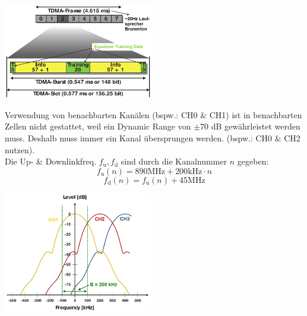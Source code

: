     \begin{minipage}{6.5cm}        
        \includegraphics[width=6.5cm]{./bilder/systems-tdma.png} \\
        
    \end{minipage}
    \begin{minipage}{0.5cm}        
        \quad
    \end{minipage}
    \begin{minipage}{5.4cm} 
         \small
        Verwendung von benachbarten Kanälen (bspw.: CH0 \& CH1) ist in benachbarten Zellen nicht gestattet, weil ein
        Dynamic Range von $\pm 70$ dB gewährleistet werden muss. Deshalb muss immer ein Kanal übersprungen werden. 
        (bspw.: CH0 \& CH2 nutzen). \\
        Die Up- \& Downlinkfreq. $f_{\text{u}},f_{\text{d}}$ sind durch die Kanalnummer $n$ gegeben:
            $$f_{\text{u}}(n)=890\text{MHz} + 200\text{kHz}\cdot n$$
            $$f_{\text{d}}(n)=f_{\text{u}}(n)+45\text{MHz}$$
        \normalsize
    \end{minipage}
    \begin{minipage}{6.5cm}        
        \includegraphics[width=6.5cm]{./bilder/systems-gsm-spectrum.png}
    \end{minipage}


